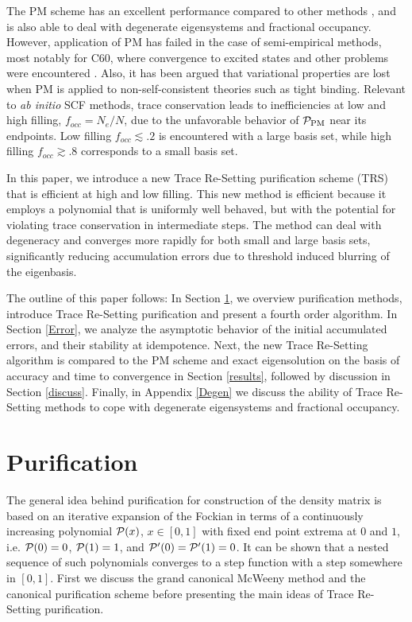 \commentoutA{\documentclass[prl,aps,twocolumn,showpacs,twocolumngrid,superbib]{revtex4}}
\begin{document}
The PM scheme has an excellent performance compared to other methods \cite{APalser99,ADaniels99,GBerghold02,YShao02}, and is also
able to deal with degenerate eigensystems and fractional occupancy.  However, application of PM has failed 
in the case of semi-empirical methods, most notably for C60, where convergence to excited states and 
other problems were encountered \cite{ADaniels99}.   Also, it has been argued that variational properties 
are lost when PM is applied to non-self-consistent theories such as tight binding\cite{APalser99}.
Relevant to {\it ab initio} SCF methods, trace conservation leads to  inefficiencies at low 
and high filling, $f_{occ}=N_e/N$, due to the unfavorable behavior of ${\cal P}_{\rm PM}$ near 
its endpoints.  Low filling $f_{occ}\lesssim .2$  is encountered with a large basis set, while high 
filling $f_{occ} \gtrsim .8$ corresponds to a small basis set.

In this paper, we introduce a new Trace Re-Setting purification scheme (TRS) 
that is efficient at high and low filling.  This new method is 
efficient because it employs a polynomial that is uniformly well behaved, but with the
potential for violating trace conservation in intermediate steps.  The method can deal with
degeneracy and converges more rapidly for both small and large basis sets, significantly reducing 
accumulation errors due to threshold induced blurring of the eigenbasis.

The outline of this paper follows:  In Section \ref{TSP}, we overview purification methods, introduce 
Trace Re-Setting purification
and present a fourth order algorithm.  In Section \ref{Error}, we analyze the asymptotic behavior of 
the initial accumulated errors, and their stability at idempotence.  Next, the new Trace Re-Setting 
algorithm is compared to the PM scheme and exact eigensolution on the basis of accuracy and time to 
convergence in Section \ref{results}, followed by discussion in Section \ref{discuss}.  Finally,
in Appendix \ref{Degen} we discuss the ability of Trace Re-Setting methods to cope with degenerate 
eigensystems and fractional occupancy.  


\section{Purification}\label{TSP}

The general idea behind purification for construction 
of the density matrix is based on an iterative expansion of the
Fockian in terms of a continuously increasing 
polynomial ${\cal P}(x)$, $x \in [0,1]$  with fixed end point extrema
at $0$ and $1$, i.e. ${\cal P}(0) = 0$, ${\cal P}(1) = 1$, and ${\cal P}'(0)={\cal P}'(1)=0$. 
It can be shown that a nested sequence of such polynomials 
converges to a step function with a step somewhere in $[0,1]$. 
First we discuss the grand canonical McWeeny method and the canonical
purification scheme before presenting the main ideas of Trace Re-Setting purification.
\end{document}

